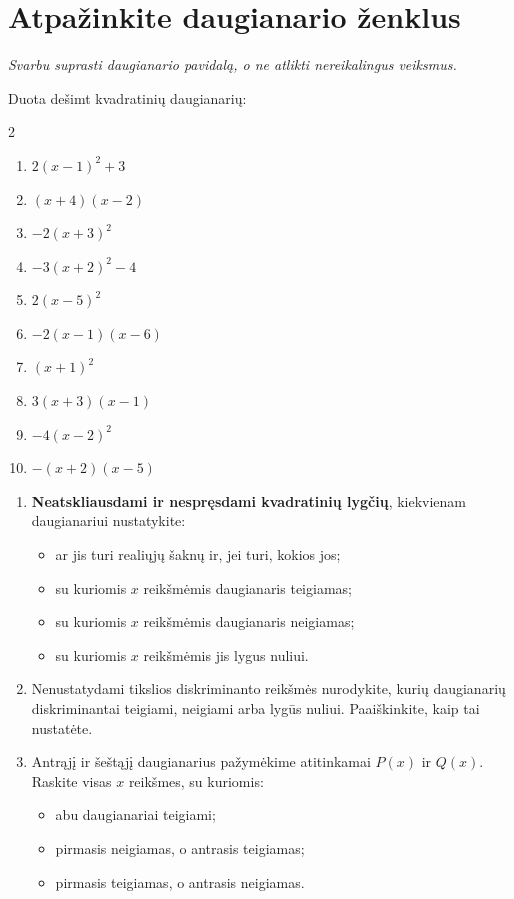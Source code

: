 \documentclass[11pt,a4paper]{article}
\newcommand{\uzd}[2]{\needspace{7\baselineskip}\section{#1}\textit{#2}\par\smallskip}
\begin{document}
\uzd{Atpažinkite daugianario ženklus}{Svarbu suprasti daugianario pavidalą, o ne atlikti nereikalingus veiksmus.}
Duota dešimt kvadratinių daugianarių:
\begin{multicols}{2}
\begin{enumerate}[label=\textbf{\arabic*.},leftmargin=0.8cm,itemsep=.65em]
\item $2(x-1)^2+3$
\item $(x+4)(x-2)$
\item $-2(x+3)^2$
\item $-3(x+2)^2-4$
\item $2(x-5)^2$
\item $-2(x-1)(x-6)$
\item $(x+1)^2$
\item $3(x+3)(x-1)$
\item $-4(x-2)^2$
\item $-(x+2)(x-5)$
\end{enumerate}
\end{multicols}
\begin{enumerate}
\item \textbf{Neatskliausdami ir nespręsdami kvadratinių lygčių}, kiekvienam
 daugianariui nustatykite:
\begin{itemize}
\item ar jis turi realiųjų šaknų ir, jei turi, kokios jos;
\item su kuriomis $x$ reikšmėmis daugianaris teigiamas;
\item su kuriomis $x$ reikšmėmis daugianaris neigiamas;
\item su kuriomis $x$ reikšmėmis jis lygus nuliui.
\end{itemize}
\item Nenustatydami tikslios diskriminanto reikšmės nurodykite, kurių
 daugianarių diskriminantai teigiami, neigiami arba lygūs nuliui.
 Paaiškinkite, kaip tai nustatėte.
\item Antrąjį ir šeštąjį daugianarius pažymėkime atitinkamai $P(x)$ ir $Q(x)$.
 Raskite visas $x$ reikšmes, su kuriomis:
\begin{itemize}
\item abu daugianariai teigiami;
\item pirmasis neigiamas, o antrasis teigiamas;
\item pirmasis teigiamas, o antrasis neigiamas.
\end{itemize}
\end{enumerate}
\end{document}
